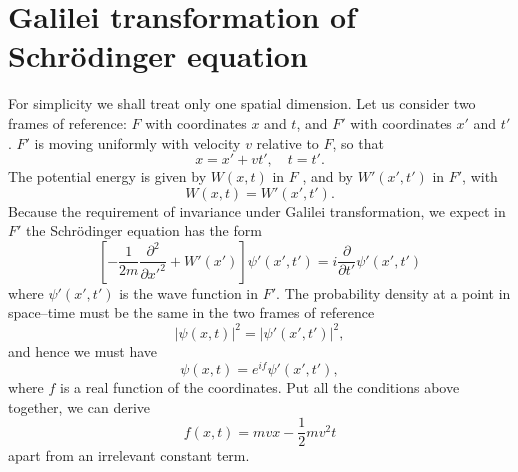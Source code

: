 \section{Galilei transformation of Schr\"{o}dinger equation}
For simplicity we shall treat only one spatial dimension. Let us consider two frames of reference: $F$ with coordinates $x$ and $t$, and $F'$ with coordinates $x'$ and $t'$. $F'$ is moving uniformly with velocity $v$ relative to $F$, so that
\[x = x' + vt' , \quad t=t'.\]
The potential energy is given by $W(x,t)$ in $F$ , and by $W'(x',t')$ in $F'$, with
\[W(x,t) = W'(x',t').\]
Because the requirement of invariance under Galilei transformation, we expect in $F'$ the  Schr\"{o}dinger equation has the form
\[ \left[- \frac{1}{2m} \frac{\partial^2}{\partial x'^2} + W'(x') \right] \psi'(x',t') = i\frac{\partial}{\partial t'}\psi'(x',t')\]
where $\psi'(x',t')$ is the wave function in $F'$.
The probability density at a point in space–time must be the same in the two frames of reference
\[|\psi(x,t)|^2 = |\psi'(x',t')|^2,\]
and hence we must have
\[\psi(x,t) = e^{if}\psi'(x',t'),\]
where $f$ is a real function of the coordinates.
Put all the conditions above together, we can derive
\[f(x,t) = mvx - \frac{1}{2} mv^2t \]
apart from an irrelevant constant term.

